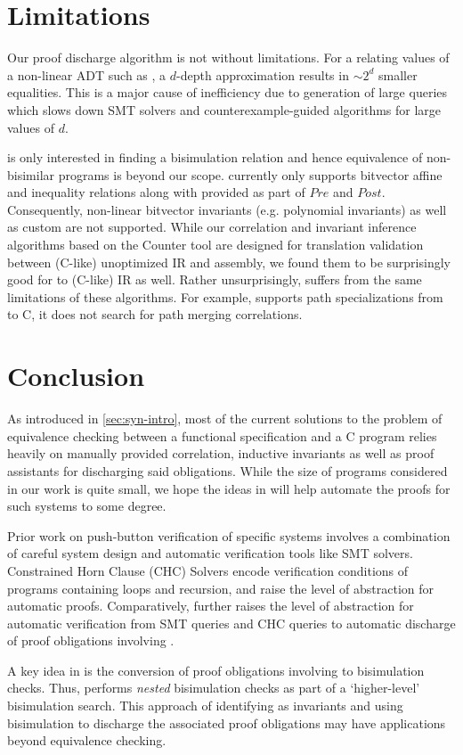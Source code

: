\section{Limitations}
\label{sec:limitations}
Our proof discharge algorithm is not without limitations.
For a \recursiveRelation{} relating values of a non-linear ADT such as , a $d$-depth
approximation results in $\sim 2^d$ smaller equalities. This is a major cause of inefficiency due to
generation of large queries which slows down SMT solvers and counterexample-guided algorithms for large values of $d$.

\toolName{} is only interested in finding a bisimulation relation and hence
equivalence of non-bisimilar programs is beyond our scope.
\toolName{} currently only supports bitvector affine and inequality relations
along with \recursiveRelations{} provided as part of $Pre$ and $Post$.
Consequently, non-linear bitvector invariants (e.g. polynomial invariants)
as well as custom \recursiveRelations{} are not supported.
While our correlation and invariant inference algorithms based on the Counter tool \cite{oopsla20}
are designed for translation validation between (C-like) unoptimized IR and assembly, we found them
to be surprisingly good for \SpecL{} to (C-like) IR as well. Rather unsurprisingly, \toolName{}
suffers from the same limitations of these algorithms. For example, \toolName{} supports path
specializations from \SpecL{} to C, it does not search for path merging correlations.

\section{Conclusion}
\label{sec:conclusion}
As introduced in \cref{sec:syn-intro}, most of the current solutions
to the problem of equivalence checking between a functional specification
and a C program relies heavily on manually provided correlation, inductive
invariants as well as proof assistants for discharging said obligations.
While the size of programs considered in our work is quite small,
we hope the ideas in \toolName{} will help
automate the proofs for such systems to some degree.

Prior work on push-button verification of specific
systems \cite{fscq,hyperkernel,serval,verifiedBPF}
involves a combination of careful system design and
automatic verification tools like SMT solvers.
Constrained Horn Clause (CHC) Solvers \cite{CHCeq}
encode verification conditions of programs containing loops and recursion,
and raise the level of abstraction for automatic proofs.
Comparatively, \toolName{} further raises the level
of abstraction for automatic verification from
SMT queries and CHC queries to automatic discharge of
proof obligations involving \recursiveRelations{}.

A key idea in \toolName{} is the conversion of proof
obligations involving \recursiveRelations{} to
bisimulation checks. Thus, \toolName{} performs {\em nested}
bisimulation checks as part of a `higher-level'
bisimulation search. This approach of
identifying \recursiveRelations{} as invariants and using
bisimulation to discharge the associated
proof obligations may have applications
beyond equivalence checking.
